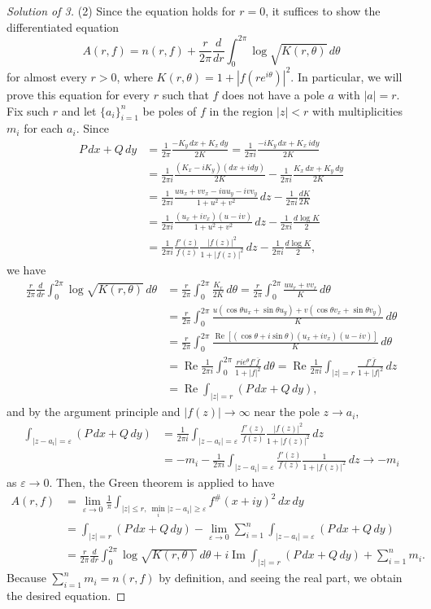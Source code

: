 \documentclass[a4paper]{article}
\theoremstyle{definition}
\renewcommand{\Re}{\operatorname{Re}}
\renewcommand{\Im}{\operatorname{Im}}
\newcommand{\e}{\varepsilon}
\renewcommand{\bar}{\overline}
\begin{document}
\begin{proof}[Solution of 3]
(2)
Since the equation holds for $r=0$, it suffices to show the differentiated equation
\[A(r,f)=n(r,f)+\frac r{2\pi}\frac d{dr}\int_0^{2\pi}\log\sqrt{K(r,\theta)}\,d\theta\]
for almost every $r>0$, where $K(r,\theta)=1+|f(re^{i\theta})|^2$.
In particular, we will prove this equation for every $r$ such that $f$ does not have a pole $a$ with $|a|=r$.
Fix such $r$ and let $\{a_i\}_{i=1}^n$ be poles of $f$ in the region $|z|<r$ with multiplicities $m_i$ for each $a_i$.
Since
\begin{align*}
P\,dx+Q\,dy&=\frac1{2\pi}\frac{-K_y\,dx+K_x\,dy}{2K}=\frac1{2\pi i}\frac{-iK_y\,dx+K_x\,idy}{2K}\\
&=\frac1{2\pi i}\frac{(K_x-iK_y)(dx+idy)}{2K}-\frac1{2\pi i}\frac{K_x\,dx+K_y\,dy}{2K}\\
&=\frac1{2\pi i}\frac{uu_x+vv_x-iuu_y-ivv_y}{1+u^2+v^2}\,dz-\frac1{2\pi i}\frac{dK}{2K}\\
&=\frac1{2\pi i}\frac{(u_x+iv_x)(u-iv)}{1+u^2+v^2}\,dz-\frac1{2\pi i}\frac{d\log K}2\\
&=\frac1{2\pi i}\frac{f'(z)}{f(z)}\frac{|f(z)|^2}{1+|f(z)|^2}\,dz-\frac1{2\pi i}\frac{d\log K}2,
\end{align*}
we have
\begin{align*}
\frac r{2\pi}\frac d{dr}\int_0^{2\pi}\log\sqrt{K(r,\theta)}\,d\theta
&=\frac r{2\pi}\int_0^{2\pi}\frac{K_r}{2K}\,d\theta=\frac r{2\pi}\int_0^{2\pi}\frac{uu_r+vv_r}{K}\,d\theta\\
&=\frac r{2\pi}\int_0^{2\pi}\frac{u(\cos\theta u_x+\sin\theta u_y)+v(\cos\theta v_x+\sin\theta v_y)}{K}\,d\theta\\
&=\frac r{2\pi}\int_0^{2\pi}\frac{\Re[(\cos\theta+i\sin\theta)(u_x+iv_x)(u-iv)]}{K}\,d\theta\\
&=\Re\frac1{2\pi i}\int_0^{2\pi}\frac{rie^\theta f'\bar f}{1+|f|^2}\,d\theta=\Re\frac1{2\pi i}\int_{|z|=r}\frac{f'\bar f}{1+|f|^2}\,dz\\
&=\Re\int_{|z|=r}(P\,dx+Q\,dy),
\end{align*}
and by the argument principle and $|f(z)|\to\infty$ near the pole $z\to a_i$,
\begin{align*}
\int_{|z-a_i|=\e}(P\,dx+Q\,dy)&=\frac1{2\pi i}\int_{|z-a_i|=\e}\frac{f'(z)}{f(z)}\frac{|f(z)|^2}{1+|f(z)|^2}\,dz\\
&=-m_i-\frac1{2\pi i}\int_{|z-a_i|=\e}\frac{f'(z)}{f(z)}\frac1{1+|f(z)|^2}\,dz\to-m_i
\end{align*}
as $\e\to0$.
Then, the Green theorem is applied to have
\begin{align*}
A(r,f)&=\lim_{\e\to0}\frac1\pi\int_{|z|\le r,\ \min_i|z-a_i|\ge\e}f^\#(x+iy)^2\,dx\,dy\\
&=\int_{|z|=r}(P\,dx+Q\,dy)-\lim_{\e\to0}\sum_{i=1}^n\int_{|z-a_i|=\e}(P\,dx+Q\,dy)\\
&=\frac r{2\pi}\frac d{dr}\int_0^{2\pi}\log\sqrt{K(r,\theta)}\,d\theta+i\Im\int_{|z|=r}(P\,dx+Q\,dy)+\sum_{i=1}^nm_i.
\end{align*}
Because $\sum_{i=1}^nm_i=n(r,f)$ by definition, and seeing the real part, we obtain the desired equation.


\end{proof}
\end{document}
